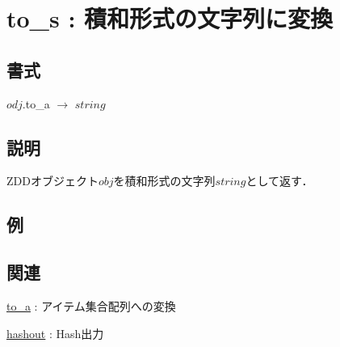 
\section{to\_s : 積和形式の文字列に変換  \label{sect:to_s}}
\subsection*{書式}
$odj$.to\_a $\rightarrow$ $string$

\subsection*{説明}
ZDDオブジェクト$obj$を積和形式の文字列$string$として返す．

\subsection*{例}


\subsection*{関連}
\hyperref[sect:to_a]{to\_a} : アイテム集合配列への変換

\hyperref[sect:hashout]{hashout} : Hash出力

